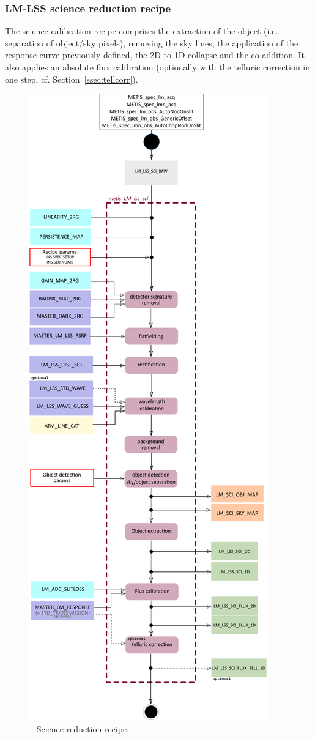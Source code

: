 \subsubsection{LM-LSS science reduction recipe }\label{rec:metis_lm_lss_sci}
The science calibration recipe comprises the extraction of the object (i.e. separation of object/sky pixels), removing the sky lines, the application of the response curve previously defined, the 2D to 1D collapse and the co-addition. It also applies an absolute flux calibration (optionally with the telluric correction in one step, cf. Section~\ref{ssec:tellcorr}).
\begin{figure}[ht]
  \centering
  \includegraphics[width=0.36\textheight]{figures/metis_lm_lss_sci_v0.83.pdf}
  \caption[Recipe: ]{ --
    Science reduction recipe.}
  \label{Fig:rec_lm_lss_sci}
\end{figure}
\clearpage

